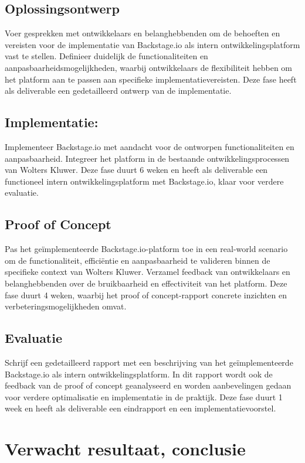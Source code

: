 \subsection{Oplossingsontwerp }
Voer gesprekken met ontwikkelaars en belanghebbenden om de behoeften en vereisten voor de implementatie van Backstage.io als intern ontwikkelingsplatform vast te stellen. Definieer duidelijk de functionaliteiten en aanpasbaarheidsmogelijkheden, waarbij ontwikkelaars de flexibiliteit hebben om het platform aan te passen aan specifieke implementatievereisten. Deze fase heeft als deliverable een gedetailleerd ontwerp van de implementatie.

\subsection{Implementatie:}
Implementeer Backstage.io met aandacht voor de ontworpen functionaliteiten en aanpasbaarheid. Integreer het platform in de bestaande ontwikkelingsprocessen van Wolters Kluwer. Deze fase duurt 6 weken en heeft als deliverable een functioneel intern ontwikkelingsplatform met Backstage.io, klaar voor verdere evaluatie.

\subsection{Proof of Concept}
Pas het geïmplementeerde Backstage.io-platform toe in een real-world scenario om de functionaliteit, efficiëntie en aanpasbaarheid te valideren binnen de specifieke context van Wolters Kluwer. Verzamel feedback van ontwikkelaars en belanghebbenden over de bruikbaarheid en effectiviteit van het platform. Deze fase duurt 4 weken, waarbij het proof of concept-rapport concrete inzichten en verbeteringsmogelijkheden omvat.

\subsection{Evaluatie}
Schrijf een gedetailleerd rapport met een beschrijving van het geïmplementeerde Backstage.io als intern ontwikkelingsplatform. In dit rapport wordt ook de feedback van de proof of concept geanalyseerd en worden aanbevelingen gedaan voor verdere optimalisatie en implementatie in de praktijk. Deze fase duurt 1 week en heeft als deliverable een eindrapport en een implementatievoorstel.

\section{Verwacht resultaat, conclusie}%
\label{sec:verwachte_resultaten}

